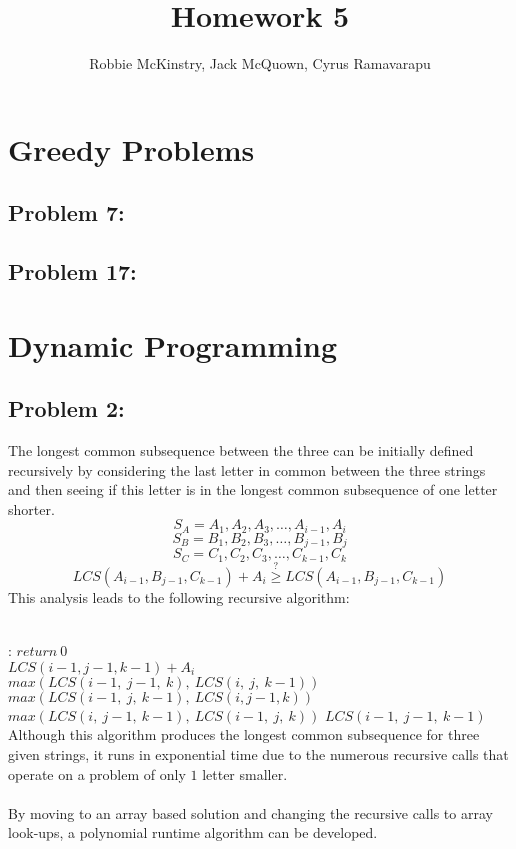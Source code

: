 \documentclass[12pt]{article}
\begin{document}
\title{Homework 5}
\author{Robbie McKinstry, Jack McQuown, Cyrus Ramavarapu}
\renewcommand{\today}{12 September 2016}
\renewcommand{\baselinestretch}{1.5}

\maketitle

\section*{Greedy Problems}
\subsection*{Problem 7:}

\subsection*{Problem 17:}

\section*{Dynamic Programming}
\subsection*{Problem 2:}
The longest common subsequence between the three can be
initially defined recursively by considering the last 
letter in common between the three strings and then 
seeing if this letter is in the longest common subsequence
of one letter shorter.
\[
S_A = A_1, A_2, A_3,\dots,A_{i-1},A_i
\]
\[
S_B = B_1, B_2, B_3,\dots,B_{j-1},B_j
\]
\[
S_C = C_1, C_2, C_3,\dots,C_{k-1},C_k
\] 
\[
LCS(A_{i-1}, B_{j-1}, C_{k-1}) + A_i \overset{?}{\geq} LCS(A_{i-1}, B_{j-1}, C_{k-1}) 
\]
This analysis leads to the following recursive algorithm:\\\\
\begin{algorithmic}[H]

:
    \State $return\ 0$
\EndIf\\
    \State$LCS(i-1,j-1,k-1) + A_i$
\Else 
        \State$max(LCS(i-1,\ j-1,\ k),\ LCS(i,\ j,\ k-1))$
    \Else
            \State $max(LCS(i-1,\ j,\ k-1),\ LCS(i, j-1, k))$
        \Else
                \State$max(LCS(i,\ j-1,\ k-1),\ LCS(i-1,\ j,\ k))$
            \Else
                \State$LCS(i-1,\ j-1,\ k-1)$
            \EndIf
       \EndIf
   \EndIf
\EndIf  
\EndFunction
Although this algorithm produces the longest common subsequence for
three given strings, it runs in exponential time due to the numerous
recursive calls that operate on a problem of only $1$ letter smaller.\\\\
By moving to an array based solution and changing the recursive calls 
to array look-ups, a polynomial runtime algorithm can be developed.  
\end{algorithmic}
\end{document}
